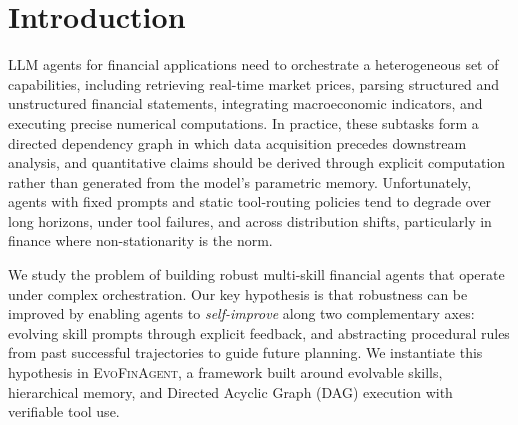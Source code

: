 \documentclass{article}
\newcommand{\eat}[1]{}
\begin{document}
\begin{abstract}
\end{abstract}

\section{Introduction}

\eat{LLM agents for finance must combine heterogeneous capabilities: retrieving real-time prices, parsing financial statements, incorporating macro indicators, and performing precise calculations. In practice, these tasks form a dependency graph: data must be fetched before analysis, and all quantitative claims should be computed rather than hallucinated. Unfortunately, agents with fixed prompts and static tool routing often degrade under longer horizons, tool errors, and distribution shift, especially in finance where non-stationarity is the norm.}

LLM agents for financial applications need to orchestrate a heterogeneous set of capabilities, including retrieving real-time market prices, parsing structured and unstructured financial statements, integrating macroeconomic indicators, and executing precise numerical computations.
In practice, these subtasks form a directed dependency graph in which data acquisition precedes downstream analysis, and quantitative claims should be derived through explicit computation rather than generated from the model's parametric memory.
Unfortunately, agents with fixed prompts and static tool-routing policies tend to degrade over long horizons, under tool failures, and across distribution shifts, particularly in finance where non-stationarity is the norm.

We study the problem of building robust multi-skill financial agents that operate under complex orchestration. 
Our key hypothesis is that robustness can be improved by enabling agents to \emph{self-improve} along two complementary axes: evolving skill prompts through explicit feedback, and abstracting procedural rules from past successful trajectories to guide future planning. 
We instantiate this hypothesis in \textsc{EvoFinAgent}, a framework built around evolvable skills, hierarchical memory, and Directed Acyclic Graph (DAG) execution with verifiable tool use.
\end{document}
